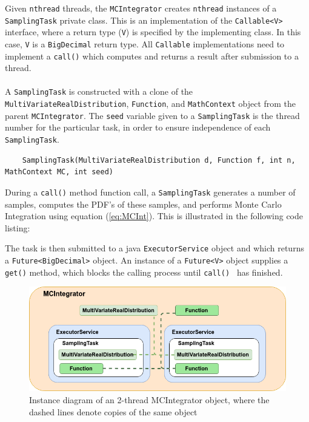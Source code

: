 Given \texttt{nthread} threads, the \texttt{MCIntegrator} creates \texttt{nthread} instances of a \texttt{SamplingTask} private class. This is an implementation of the \texttt{Callable<V>} interface, where a return type (\texttt{V}) is specified by the implementing class. In this case, \texttt{V} is a \texttt{BigDecimal} return type. All \texttt{Callable} implementations need to implement a \texttt{call()} which computes and returns a result after submission to a thread.
\\\\
A \texttt{SamplingTask} is constructed with a clone of the \texttt{MultiVariateRealDistribution}, \texttt{Function}, and \texttt{MathContext} object from the parent \texttt{MCIntegrator}. The \texttt{seed} variable given to a \texttt{SamplingTask} is the thread number for the particular task, in order to ensure independence of each \texttt{SamplingTask}.
\begin{lstlisting}
    SamplingTask(MultiVariateRealDistribution d, Function f, int n, MathContext MC, int seed)
\end{lstlisting}

During a \texttt{call()} method function call, a \texttt{SamplingTask} generates a number of samples, computes the PDF's of these samples, and performs Monte Carlo Integration using equation (\ref{eq:MCInt}). This is illustrated in the following code listing:


The task is then submitted to a java \texttt{ExecutorService} object and which returns a \texttt{Future<BigDecimal>} object. An instance of a \texttt{Future<V>} object supplies a \texttt{get()} method, which blocks the calling process until \texttt{call() } has finished.

\begin{figure}[H]
\begin{center}
\includegraphics[width=.6\textwidth]{Chap5_DesignAndImplementation/MCIntegrator.png}
\caption{Instance diagram of an 2-thread MCIntegrator object, where the dashed lines denote copies of the same object}
\label{fig:MCIntegrator}
\end{center}
\end{figure}


